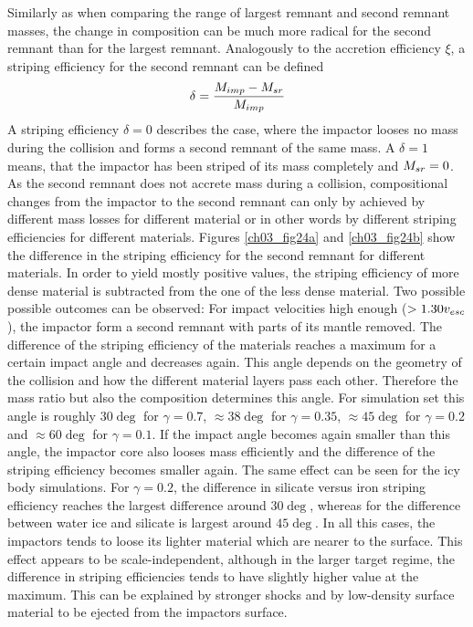 Similarly as when comparing the range of largest remnant and second remnant masses, the change in composition can be much more radical for the second remnant than for the largest remnant. Analogously to the accretion efficiency $\xi$, a striping efficiency for the second remnant can be defined
\begin{align}
\delta = \frac{M_{imp} - M_{sr}}{M_{imp}}
\end{align}
A striping efficiency $\delta = 0$ describes the case, where the impactor looses no mass during the collision and forms a second remnant of the same mass. A $\delta = 1$ means, that the impactor has been striped of its mass completely and $M_{sr} = 0$. As the second remnant does not accrete mass during a collision, compositional changes from the impactor to the second remnant can only by achieved by different mass losses for different material or in other words by different striping efficiencies for different materials. Figures \ref{ch03_fig24a} and \ref{ch03_fig24b} show the difference in the striping efficiency for the second remnant for different materials. In order to yield mostly positive values, the striping efficiency of more dense material is subtracted from the one of the less dense material. Two possible possible outcomes can be observed: For impact velocities high enough ($ > 1.30 v_{esc}$), the impactor form a second remnant with parts of its mantle removed. The difference of the striping efficiency of the materials reaches a maximum for a certain impact angle and decreases again. This angle depends on the geometry of the collision and how the different material layers pass each other. Therefore the mass ratio but also the composition determines this angle. For simulation set \css this angle is roughly $30 \deg$ for $\gamma = 0.7$, $\approx 38 \deg$ for $\gamma = 0.35$, $\approx 45 \deg$ for $\gamma = 0.2$ and $\approx 60 \deg$ for $\gamma = 0.1$. If the impact angle becomes again smaller than this angle, the impactor core also looses mass efficiently and the difference of the striping efficiency becomes smaller again. The same effect can be seen for the icy body simulations. For $\gamma = 0.2$, the difference in silicate versus iron striping efficiency reaches the largest difference around $30 \deg$, whereas for the difference between water ice and silicate is largest around $45 \deg$. In all this cases, the impactors tends to loose its lighter material which are nearer to the surface. This effect appears to be scale-independent, although in the larger target regime, the difference in striping efficiencies tends to have slightly higher value at the maximum. This can be explained by stronger shocks and by low-density surface material to be ejected from the impactors surface. 

